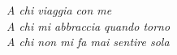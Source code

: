 
\vspace*{\fill}
\begin{flushright}
    \textit{A chi viaggia con me \\
    A chi mi abbraccia quando torno \\
    A chi non mi fa mai sentire sola \\}
\end{flushright}  
\vspace*{\fill}

    

   




